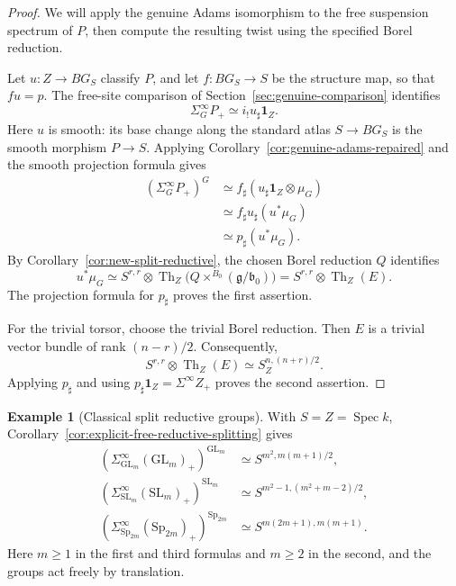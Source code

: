 \documentclass[11pt,reqno]{amsart}
\theoremstyle{definition}
\newtheorem{example}[theorem]{Example}
\theoremstyle{remark}
\theoremstyle{plain}
\numberwithin{equation}{section}
\newcommand{\one}{\mathbf 1}
\DeclareMathOperator{\Spec}{Spec}
\DeclareMathOperator{\Th}{Th}
\begin{document}
\begin{proof}
We will apply the genuine Adams isomorphism to the free
suspension spectrum of \(P\), then compute the resulting
twist using the specified Borel reduction.

Let \(u:Z\to BG_S\) classify \(P\), and let
\(f:BG_S\to S\) be the structure map, so that \(fu=p\).
The free-site comparison of
Section~\ref{sec:genuine-comparison} identifies
\[
 \Sigma_G^\infty P_+\simeq i_!u_\sharp\one_Z.
\]
Here \(u\) is smooth: its base change along the standard
atlas \(S\to BG_S\) is the smooth morphism \(P\to S\).
Applying Corollary~\ref{cor:genuine-adams-repaired} and
the smooth projection formula gives
\[
 \begin{aligned}
 (\Sigma_G^\infty P_+)^G
 &\simeq f_\sharp(u_\sharp\one_Z\otimes\mu_G)\\
 &\simeq f_\sharp u_\sharp(u^*\mu_G)\\
 &\simeq p_\sharp(u^*\mu_G).
 \end{aligned}
\]
By Corollary~\ref{cor:new-split-reductive}, the chosen
Borel reduction \(Q\) identifies
\[
 u^*\mu_G
 \simeq S^{r,r}\otimes
 \Th_Z\bigl(Q\times^{B_0}(\mathfrak g/\mathfrak b_0)\bigr)
 = S^{r,r}\otimes\Th_Z(E).
\]
The projection formula for \(p_\sharp\) proves the
first assertion.

For the trivial torsor, choose the trivial Borel reduction.
Then \(E\) is a trivial vector bundle of rank \((n-r)/2\).
Consequently,
\[
 S^{r,r}\otimes\Th_Z(E)
 \simeq S^{n,(n+r)/2}_Z.
\]
Applying \(p_\sharp\) and using
\(p_\sharp\one_Z=\Sigma^\infty Z_+\) proves the second
assertion.
\end{proof}

\begin{example}[Classical split reductive groups]
With \(S=Z=\Spec k\),
Corollary~\ref{cor:explicit-free-reductive-splitting} gives
\[
 \begin{aligned}
 (\Sigma_{\mathrm{GL}_m}^\infty(\mathrm{GL}_m)_+)
       ^{\mathrm{GL}_m}
 &\simeq S^{m^2,m(m+1)/2},\\
 (\Sigma_{\mathrm{SL}_m}^\infty(\mathrm{SL}_m)_+)
       ^{\mathrm{SL}_m}
 &\simeq S^{m^2-1,(m^2+m-2)/2},\\
 (\Sigma_{\mathrm{Sp}_{2m}}^\infty(\mathrm{Sp}_{2m})_+)
       ^{\mathrm{Sp}_{2m}}
 &\simeq S^{m(2m+1),m(m+1)}.
 \end{aligned}
\]
Here \(m\geq1\) in the first and third formulas and
\(m\geq2\) in the second, and the groups act freely by
translation. 
\end{example}
\end{document}
